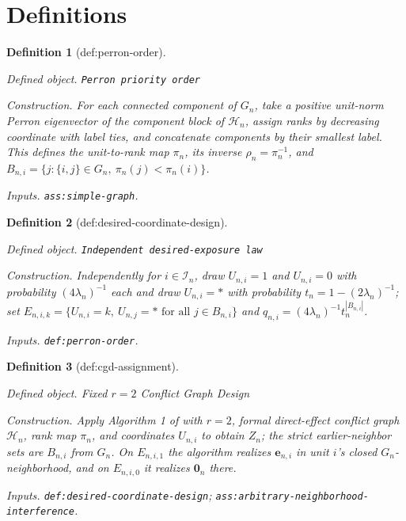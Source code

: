 \documentclass{article}
\newtheorem{definition}{Definition}
\begin{document}
\section{Definitions}

\begin{definition}[def:perron-order]\label{def:perron-order}
\par\smallskip\noindent\emph{Defined object.} \texttt{Perron priority order}
\par\smallskip\noindent\emph{Construction.} For each connected component of \(G_n\), take a positive unit-norm Perron eigenvector of the component block of \(\mathcal H_n\), assign ranks by decreasing coordinate with label ties, and concatenate components by their smallest label. This defines the unit-to-rank map \(\pi_n\), its inverse \(\rho_n=\pi_n^{-1}\), and \(B_{n,i}=\{j:\{i,j\}\in G_n,\ \pi_n(j)<\pi_n(i)\}\).
\par\smallskip\noindent\emph{Inputs.} \texttt{ass:\allowbreak{}simple-\allowbreak{}graph}.
\end{definition}

\begin{definition}[def:desired-coordinate-design]\label{def:desired-coordinate-design}
\par\smallskip\noindent\emph{Defined object.} \texttt{Independent desired-\allowbreak{}exposure law}
\par\smallskip\noindent\emph{Construction.} Independently for \(i\in\mathcal I_n\), draw \(U_{n,i}=1\) and \(U_{n,i}=0\) with probability \((4\lambda_n)^{-1}\) each and draw \(U_{n,i}=*\) with probability \(t_n=1-(2\lambda_n)^{-1}\); set \(E_{n,i,k}=\{U_{n,i}=k,\ U_{n,j}=*\text{ for all }j\in B_{n,i}\}\) and \(q_{n,i}=(4\lambda_n)^{-1}t_n^{|B_{n,i}|}\).
\par\smallskip\noindent\emph{Inputs.} \texttt{def:\allowbreak{}perron-\allowbreak{}order}.
\end{definition}

\begin{definition}[def:cgd-assignment]\label{def:cgd-assignment}
\par\smallskip\noindent\emph{Defined object.} Fixed \(r=2\) Conflict Graph Design
\par\smallskip\noindent\emph{Construction.} Apply Algorithm 1 of \cite{KandirosPipisDaskalakisHarshaw2024CGD} with \(r=2\), formal direct-effect conflict graph \(\mathcal H_n\), rank map \(\pi_n\), and coordinates \(U_{n,i}\) to obtain \(Z_n\); the strict earlier-neighbor sets are \(B_{n,i}\) from \(G_n\). On \(E_{n,i,1}\) the algorithm realizes \(\mathbf e_{n,i}\) in unit \(i\)'s closed \(G_n\)-neighborhood, and on \(E_{n,i,0}\) it realizes \(\mathbf 0_n\) there.
\par\smallskip\noindent\emph{Inputs.} \texttt{def:\allowbreak{}desired-\allowbreak{}coordinate-\allowbreak{}design}; \texttt{ass:\allowbreak{}arbitrary-\allowbreak{}neighborhood-\allowbreak{}interference}.
\end{definition}
\end{document}
